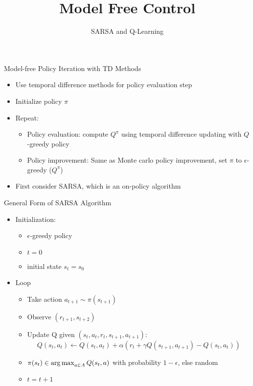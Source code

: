 


\title[Reinforcement Learning: Model Free Control]{Model Free Control}
\subtitle{SARSA and Q-Learning}



	
	\maketitle

\begin{frame}[c]{Model-free Policy Iteration with TD Methods}
	
	\begin{itemize}
		\item Use temporal difference methods for policy evaluation step
		\item Initialize policy $\pi$
		\item Repeat:
		\begin{itemize}
			\item Policy evaluation: compute $Q^\pi$ using temporal difference updating
			with $Q$-greedy policy
			\item Policy improvement: Same as Monte carlo policy improvement, set $\pi$
			to $\epsilon$-greedy ($Q^\pi$)
		\end{itemize}
		\item First consider SARSA, which is an on-policy algorithm
	\end{itemize}
	
\end{frame}
\begin{frame}[c]{General Form of SARSA Algorithm}
	
	\begin{itemize}
		\item Initialization:
		\begin{itemize}
			\item $\epsilon$-greedy policy 
			\item $t=0$
			\item initial state $s_t = s_0$
		\end{itemize} 
		\item Loop
		\begin{itemize}
			\item Take action $a_{t+1} \sim \pi(s_{t+1})$
			\item Observe $(r_{t+1}, s_{t+2})$
			\item Update Q given $(s_t, a_t, r_t, s_{t+1}, a_{t+1})$:
			$$Q(s_t,a_t) \gets Q(s_t, a_t) + \alpha (r_t + \gamma Q(s_{t+1}, a_{t+1}) - Q(s_t, a_t))$$
			\item $\pi(s_t) \in \operatorname*{arg\,max}_{a\in A} Q(s_t, a)$ with probability $1-\epsilon$, else random
			\item $t = t+1$
		\end{itemize} 
	\end{itemize}
	
\end{frame}
